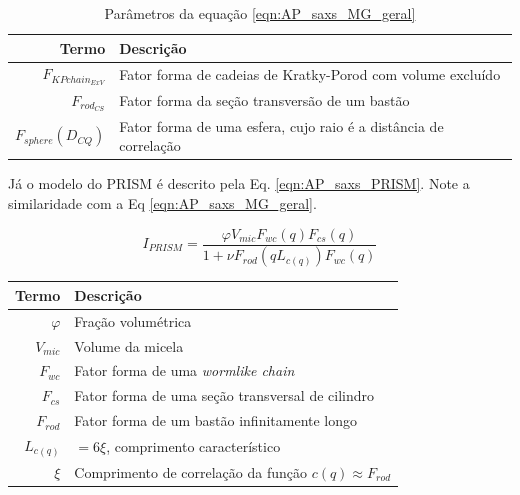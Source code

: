 \begin{apendicesenv}
\begin{table}
    \IBGEtab%
    {\caption{Parâmetros da equação \ref{eqn:AP_saxs_MG_geral}}
     \label{tab_ap:fatores_geral} }%
    {\begin{tabular}{r p{8cm}}
    \toprule
    Termo 			& Descrição        						\\
    \midrule
    \(F_{KPchain_{ExV}}\)  & Fator forma de cadeias de Kratky-Porod com volume excluído \\
    \(F_{rod_{CS}}\)		 & Fator forma da seção transversão de um bastão	\\
    \(F_{sphere}(D_{CQ})\) & Fator forma de uma esfera, cujo raio é a distância de correlação \\
    \bottomrule%
    \end{tabular}}
    {}%
\end{table}


Já o modelo do PRISM é descrito pela Eq. \ref{eqn:AP_saxs_PRISM}. Note a similaridade com a Eq \ref{eqn:AP_saxs_MG_geral}.

\begin{equation}
I_{PRISM}= \frac{\varphi V_{mic}F_{wc}(q)F_{cs}(q)}{1 + \nu F_{rod}(qL_{c(q)})F_{wc}(q)}
\label{eqn:AP_saxs_PRISM}
\end{equation}

\begin{table}
    {%
     \begin{tabular}{r p{8cm}}
     \toprule
     Termo 			& Descrição        						\\
     \midrule
     \(\varphi\)		& Fração volumétrica \\ %
     \(V_{mic}\)		& Volume da micela   \\
     \(F_{wc}\)		& Fator forma de uma \emph{wormlike chain} \\
     \(F_{cs}\)		& Fator forma de uma seção transversal de cilindro \\ %
     \(F_{rod}\)		& Fator forma de um bastão infinitamente longo \\
     \(L_{c(q)}\)		& \(=6\xi\), comprimento característico \\
     \(\xi\)			& Comprimento de correlação da função \(c(q) \approx F_{rod}\) \\
     \bottomrule
     \end{tabular}}%
     {}%
\end{table}



\end{apendicesenv}
